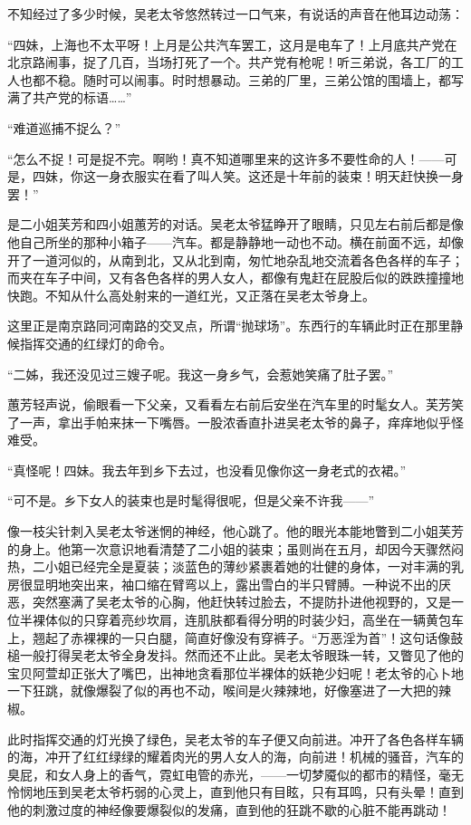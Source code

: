 \par 不知经过了多少时候，吴老太爷悠然转过一口气来，有说话的声音在他耳边动荡：
\par “四妹，上海也不太平呀！上月是公共汽车罢工，这月是电车了！上月底共产党在北京路闹事，捉了几百，当场打死了一个。共产党有枪呢！听三弟说，各工厂的工人也都不稳。随时可以闹事。时时想暴动。三弟的厂里，三弟公馆的围墙上，都写满了共产党的标语……”
\par “难道巡捕不捉么？”
\par “怎么不捉！可是捉不完。啊哟！真不知道哪里来的这许多不要性命的人！——可是，四妹，你这一身衣服实在看了叫人笑。这还是十年前的装束！明天赶快换一身罢！”
\par 是二小姐芙芳和四小姐蕙芳的对话。吴老太爷猛睁开了眼睛，只见左右前后都是像他自己所坐的那种小箱子——汽车。都是静静地一动也不动。横在前面不远，却像开了一道河似的，从南到北，又从北到南，匆忙地杂乱地交流着各色各样的车子；而夹在车子中间，又有各色各样的男人女人，都像有鬼赶在屁股后似的跌跌撞撞地快跑。不知从什么高处射来的一道红光，又正落在吴老太爷身上。
\par 这里正是南京路同河南路的交叉点，所谓“抛球场”。东西行的车辆此时正在那里静候指挥交通的红绿灯的命令。
\par “二姊，我还没见过三嫂子呢。我这一身乡气，会惹她笑痛了肚子罢。”
\par 蕙芳轻声说，偷眼看一下父亲，又看看左右前后安坐在汽车里的时髦女人。芙芳笑了一声，拿出手帕来抹一下嘴唇。一股浓香直扑进吴老太爷的鼻子，痒痒地似乎怪难受。
\par “真怪呢！四妹。我去年到乡下去过，也没看见像你这一身老式的衣裙。”
\par “可不是。乡下女人的装束也是时髦得很呢，但是父亲不许我——”
\par 像一枝尖针刺入吴老太爷迷惘的神经，他心跳了。他的眼光本能地瞥到二小姐芙芳的身上。他第一次意识地看清楚了二小姐的装束；虽则尚在五月，却因今天骤然闷热，二小姐已经完全是夏装；淡蓝色的薄纱紧裹着她的壮健的身体，一对丰满的乳房很显明地突出来，袖口缩在臂弯以上，露出雪白的半只臂膊。一种说不出的厌恶，突然塞满了吴老太爷的心胸，他赶快转过脸去，不提防扑进他视野的，又是一位半裸体似的只穿着亮纱坎肩，连肌肤都看得分明的时装少妇，高坐在一辆黄包车上，翘起了赤裸裸的一只白腿，简直好像没有穿裤子。“万恶淫为首”！这句话像鼓槌一般打得吴老太爷全身发抖。然而还不止此。吴老太爷眼珠一转，又瞥见了他的宝贝阿萱却正张大了嘴巴，出神地贪看那位半裸体的妖艳少妇呢！老太爷的心卜地一下狂跳，就像爆裂了似的再也不动，喉间是火辣辣地，好像塞进了一大把的辣椒。
\par 此时指挥交通的灯光换了绿色，吴老太爷的车子便又向前进。冲开了各色各样车辆的海，冲开了红红绿绿的耀着肉光的男人女人的海，向前进！机械的骚音，汽车的臭屁，和女人身上的香气，霓虹电管的赤光，——一切梦魇似的都市的精怪，毫无怜悯地压到吴老太爷朽弱的心灵上，直到他只有目眩，只有耳鸣，只有头晕！直到他的刺激过度的神经像要爆裂似的发痛，直到他的狂跳不歇的心脏不能再跳动！
